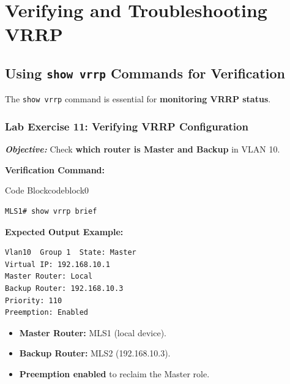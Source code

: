 \documentclass[a4paper]{book}
\begin{document}
\vspace{1.5em}

\section{Verifying and Troubleshooting VRRP}

\subsection{Using \texttt{show vrrp} Commands for Verification}
The \texttt{show vrrp} command is essential for \textbf{monitoring VRRP status}.

\subsubsection{Lab Exercise 11: Verifying VRRP Configuration}
\textbf{\textit{Objective:}} Check \textbf{which router is Master and Backup} in VLAN 10.
\vspace{0.5cm}

\textbf{Verification Command:}

\vspace{1.5em}


\begin{ocg}{Code Block}{codeblock}{0}

\vspace{0.5cm}

\begin{lstlisting}
MLS1# show vrrp brief
\end{lstlisting}
\end{ocg}



\textbf{Expected Output Example:}
\begin{lstlisting}
Vlan10  Group 1  State: Master
Virtual IP: 192.168.10.1
Master Router: Local
Backup Router: 192.168.10.3
Priority: 110
Preemption: Enabled
\end{lstlisting}
\begin{itemize}
\item \textbf{Master Router:} MLS1 (local device).
\item \textbf{Backup Router:} MLS2 (192.168.10.3).
\item \textbf{Preemption enabled} to reclaim the Master role.
\end{itemize}
\end{document}
